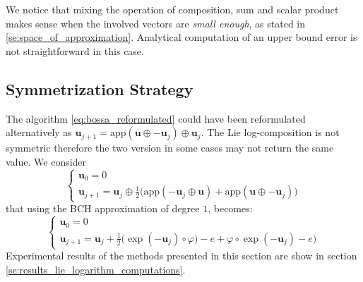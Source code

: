We notice that mixing the operation of composition, sum and scalar product makes sense when the involved vectors are \emph{small enough}, as stated in \ref{se:space_of_approximation}. 
Analytical computation of an upper bound error is not straightforward in this case. 

% 
\subsection{Symmetrization Strategy}
The algorithm \ref{eq:bossa_reformulated} could have been reformulated alternatively as $\mathbf{u}_{j+1} =    \text{app}(\mathbf{u} \oplus  - \mathbf{u}_{j}  ) \oplus \mathbf{u}_{j}$. The Lie log-composition is not symmetric therefore the two version in some cases may not return the same value. We consider
\begin{equation}\label{eq:bossa_symmetric}
\begin{cases}
\mathbf{u}_0 = 0 \\
\mathbf{u}_{j+1} = \mathbf{u}_{j} \oplus 
\frac{1}{2}
\big(  
\text{app}(-\mathbf{u}_{j}  \oplus  \mathbf{u} )
+
\text{app}(\mathbf{u} \oplus  - \mathbf{u}_{j}  )
\big)
\end{cases}
\end{equation}
that using the BCH approximation of degree $1$, becomes:
\begin{equation}
\begin{cases}
\mathbf{u}_0 = 0 \\
\mathbf{u}_{j+1} 
=
\mathbf{u}_{j} +  
\frac{1}{2}
\big(  
\exp(-\mathbf{u}_{j}) \circ \varphi ) - e
+
\varphi\circ\exp(-\mathbf{u}_{j}) - e
\big)
\end{cases}
\end{equation}
Experimental results of the methods presented in this section are show in section \ref{se:results_lie_logarithm_computations}.
